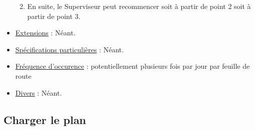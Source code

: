 \documentclass[a4paper, 10pt]{article}
\begin{document}
\begin{itemize}[label = \textbullet, font = \color{orange}]
\begin{enumerate}
\begin{itemize}
        \end{itemize}
        \item En suite, le Superviseur peut recommencer soit à partir de point 2 soit à partir de point 3.
    \end{enumerate}
    \item \underline{Extensions} : Néant.
    \item \underline{Spécifications particulières} : Néant.
    \item \underline{Fréquence d'occurence} : potentiellement plusieurs fois par jour par feuille de route
    \item \underline{Divers} : Néant.
\end{itemize}

\subsection{Charger le plan}
\end{document}
